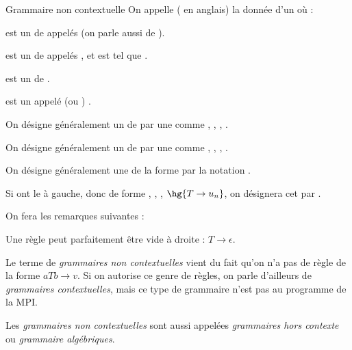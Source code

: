     \begin{definition}{Grammaire non contextuelle}{}
        On appelle  ( en anglais) la donnée d'un  où :
        \begin{enumerate}
            \itast \hg{$\bcV$} est un  de  appelés  (on parle aussi de ).
        
            \itast \hg{$\Sigma$} est un  de  appelés , et est tel que \hg{$\Sigma \cap \bcV = \emptyset$}.
            
            \itast \hg{$\bcR \subset \bcV \times \p{\Sigma \sqcup \bcV}^\star$} est un  de .
            
            \itast {} est un  appelé  (ou ) .
        \end{enumerate}
    \end{definition}
    
    \begin{notation}
        \begin{enumerate}
            \itt On désigne généralement un  de \hg{$\bcV$} par une  comme , , , \hg{$\dots$}.
            
            \itt On désigne généralement un  de \hg{$\Sigma$} par une  comme , , , \hg{$\dots$}.
            
            \itt On désigne généralement une  de la forme  par la notation .
            
            \itt Si  ont le  à gauche, donc de forme , , \hg{\dots}, $\hg{T \rightarrow u_n}$, on désignera cet  par .
        \end{enumerate}
    \end{notation}
    
    On fera les remarques suivantes :
    \begin{enumerate}
        \itt Une règle peut parfaitement être vide à droite : $T \to \epsilon$.
        
        \itt Le terme de \emph{grammaires non contextuelles} vient du fait qu'on n'a pas de règle de la forme $aTb \to v$. Si on autorise ce genre de règles, on parle d'ailleurs de \emph{grammaires contextuelles}, mais ce type de grammaire n'est pas au programme de la \textsf{MPI}.
        
        \itt Les \emph{grammaires non contextuelles} sont aussi appelées \emph{grammaires hors contexte} ou \emph{grammaire algébriques}.
    \end{enumerate} 
    
